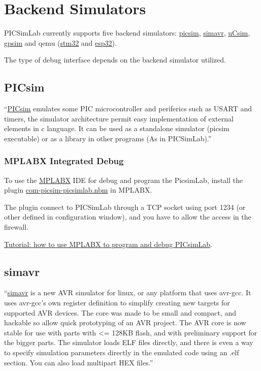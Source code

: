 \chapter{Backend Simulators}


PICSimLab currently supports five backend simulators:
\href{https://github.com/lcgamboa/picsim}{picsim},  
\href{https://github.com/buserror/simavr}{simavr}, 
\href{http://mazsola.iit.uni-miskolc.hu/\%7edrdani/embedded/ucsim/}{uCsim}, 
\href{http://gpsim.sourceforge.net/}{gpsim} and 
qemu (\href{https://beckus.github.io/qemu_stm32/}{stm32} and \href{https://github.com/a159x36/qemu}{esp32}).


The type of debug interface depends on the backend simulator utilized.

\section{PICsim}

``\href{https://github.com/lcgamboa/picsim}{PICsim} emulates some PIC microcontroller and periferics such as USART and timers, the simulator architecture permit easy implementation of external elements in c language. It can be used as a standalone simulator (picsim executable) or as a library in other programs (As in PICSimLab).''


\subsection{MPLABX Integrated Debug } \hypertarget{def:mplabxd}{}

To use the \href{http://www.microchip.com/mplabx}{MPLABX} IDE for debug and program the PicsimLab, install the plugin \href{https://github.com/lcgamboa/picsimlab_md/releases/}{com-picsim-picsimlab.nbm} in MPLABX.

The plugin connect to PICSimLab through a TCP socket using port 1234 (or other defined in configuration window), and you have to allow the access in the firewall.

\href{https://lcgamboa.github.io/picsimlab_docs/stable/UsewithMPLABX.html}{Tutorial: how to use MPLABX to program and debug PICsimLab}.


\section{simavr}

``\href{https://github.com/buserror/simavr}{simavr} is a new AVR simulator for linux, or any platform that uses avr-gcc. It uses avr-gcc's own register definition to simplify creating new targets for supported AVR devices. The core was made to be small and compact, and hackable so allow quick prototyping of an AVR project. The AVR core is now stable for use with parts with <= 128KB flash, and with preliminary support for the bigger parts. The simulator loads ELF files directly, and there is even a way to specify simulation parameters directly in the emulated code using an .elf section. You can also load multipart HEX files.''

